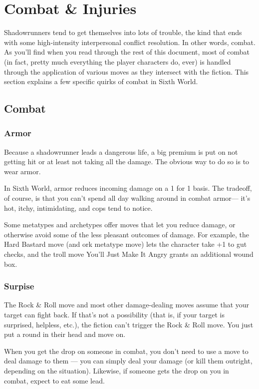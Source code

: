 \chapter{Combat \& Injuries} \label{combat}

Shadowrunners tend to get themselves into lots of trouble, the kind that ends with some high-intensity interpersonal conflict resolution. In other words, combat. As you’ll find when you read through the rest of this document, most of combat (in fact, pretty much everything the player characters do, ever) is handled through the application of various moves as they intersect with the fiction. This section explains a few specific quirks of combat in Sixth World.


\section{Combat}
\subsection*{Armor}
Because a shadowrunner leads a dangerous life, a big premium is put on not getting hit or at least not taking all the damage. The obvious way to do so is to wear armor.

In Sixth World, armor reduces incoming damage on a 1 for 1 basis. The tradeoff, of course, is that you can’t spend all day walking around in combat armor— it’s hot, itchy, intimidating, and cops tend to notice.

Some metatypes and archetypes offer moves that let you reduce damage, or otherwise avoid some of the less pleasant outcomes of damage. For example, the Hard Bastard move (and ork metatype move) lets the character take +1 to gut checks, and the troll move You’ll Just Make It Angry grants an additional wound box.



\subsection*{Surpise}
The Rock \& Roll move and most other damage-dealing moves assume that your target can fight back. If that’s not a possibility (that is, if your target is surprised, helpless, etc.), the fiction can’t trigger the Rock \& Roll move. You just put a round in their head and move on.

When you get the drop on someone in combat, you don’t need to use a move to deal damage to them — you can simply deal your damage (or kill them outright, depending on the situation). Likewise, if someone gets the drop on you in combat, expect to eat some lead.


